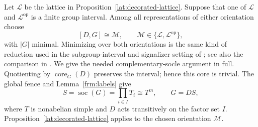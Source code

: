 Let $\mathcal L$ be the lattice in
Proposition~\ref{lat:decorated-lattice}.  Suppose that one of $\mathcal L$
and $\mathcal L^{\mathrm{op}}$ is a finite group interval.  Among all
representations of either orientation choose
\[
             [D,G]\cong\mathcal M,
       \qquad \mathcal M\in\{\mathcal L,\mathcal L^{\mathrm{op}}\},
\]
with $|G|$ minimal.  Minimizing over both orientations is the same
kind of reduction used in the subgroup-interval and signalizer setting
of \cite[Theorem~3 and Section~6]{Aschbacher2008}; see also the comparison in
\cite[Section~4]{PalfyTwisted}.  We give the needed complementary-socle
argument in full.  Quotienting by $\operatorname{core}_G(D)$ preserves
the interval; hence this core is trivial.  The global fence and
Lemma~\ref{frm:labels} give
\begin{equation}\label{ext:top-socle}
 S=\operatorname{soc}(G)=\prod_{i\in I}T_i\cong T^m,
 \qquad G=DS,
\end{equation}
where $T$ is nonabelian simple and $D$ acts transitively on the factor
set $I$.  Proposition~\ref{lat:decorated-lattice} applies to the chosen
orientation $\mathcal M$.

